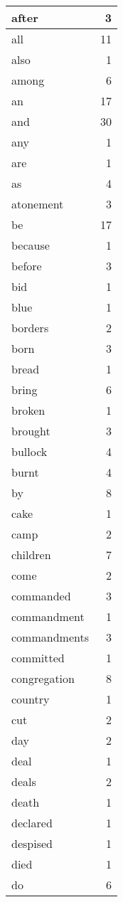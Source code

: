 \begin{center}
\begin{longtable}{l|r}
after & 3 \\ \hline
all & 11 \\ \hline
also & 1 \\ \hline
among & 6 \\ \hline
an & 17 \\ \hline
and & 30 \\ \hline
any & 1 \\ \hline
are & 1 \\ \hline
as & 4 \\ \hline
atonement & 3 \\ \hline
be & 17 \\ \hline
because & 1 \\ \hline
before & 3 \\ \hline
bid & 1 \\ \hline
blue & 1 \\ \hline
borders & 2 \\ \hline
born & 3 \\ \hline
bread & 1 \\ \hline
bring & 6 \\ \hline
broken & 1 \\ \hline
brought & 3 \\ \hline
bullock & 4 \\ \hline
burnt & 4 \\ \hline
by & 8 \\ \hline
cake & 1 \\ \hline
camp & 2 \\ \hline
children & 7 \\ \hline
come & 2 \\ \hline
commanded & 3 \\ \hline
commandment & 1 \\ \hline
commandments & 3 \\ \hline
committed & 1 \\ \hline
congregation & 8 \\ \hline
country & 1 \\ \hline
cut & 2 \\ \hline
day & 2 \\ \hline
deal & 1 \\ \hline
deals & 2 \\ \hline
death & 1 \\ \hline
declared & 1 \\ \hline
despised & 1 \\ \hline
died & 1 \\ \hline
do & 6 \\ \hline

\end{longtable}
\end{center}
